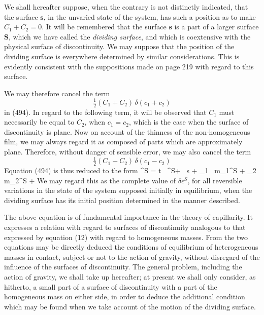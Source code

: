 \documentclass[12pt]{memoir}
\newcommand{\dd}{\delta}
\begin{document}
{We shall hereafter suppose, when the contrary is not distinctly indicated, that the surface $\mathbf{s}$, in the unvaried state of the system, has such a position as to make $C_1+C_2=0$. It will be remembered that the surface $\mathbf{s}$ is a part of a larger surface $\mathbf{S}$, which we have called the \textit{dividing surface}, and which is coextensive with the physical surface of discontinuity. We may suppose that the position of the dividing surface is everywhere determined by similar considerations. This is evidently consistent with the suppositions made on page 219 with regard to this surface.

We may therefore cancel the term
$$ \tfrac{1}{2}(C_1+ C_2) \,\delta(c_1 + c_2)$$
in (494). In regard to the following term, it will be observed that $C_1$ must necessarily be equal to $C_2$, when $c_1=c_2$, which is the case when the surface of discontinuity is plane. Now on account of the thinness of the non-homogeneous film, we may always regard it as composed of parts which are approximately plane. Therefore, without danger of sensible error, we may also cancel the term
$$ \tfrac{1}{2}(C_1- C_2) \,\delta(c_1 - c_2)$$
Equation (494) is thus reduced to the form
\eqs \dd \epsilon^S = t \, \dd \eta^S+ \sigma \, \dd s + \mu_1 \, \dd m_1^S + \mu_2 \, \dd m_2^S +   \label{497} \eqe
We may regard this as the complete value of $\dd \epsilon^S$, for all reversible variations in the state of the system supposed initially in equilibrium, when the dividing surface has its initial position determined in the manner described.


The above equation is of fundamental importance in the theory of capillarity.  It expresses a relation with regard to surfaces of discontinuity analogous to that expressed by equation (12) with regard to homogeneous masses. From the two equations may be directly deduced the conditions of equilibrium  of heterogeneous masses in contact, subject or not to the action of gravity, without disregard of the influence of the surfaces of discontinuity. The general problem, including the action of gravity, we shall take up hereafter; at present we shall only consider, as hitherto, a small part of a surface of discontinuity with a part of the homogeneous mass on either side, in order to deduce the additional condition which may be found when we take account of the motion of the dividing surface.


}
\end{document}
